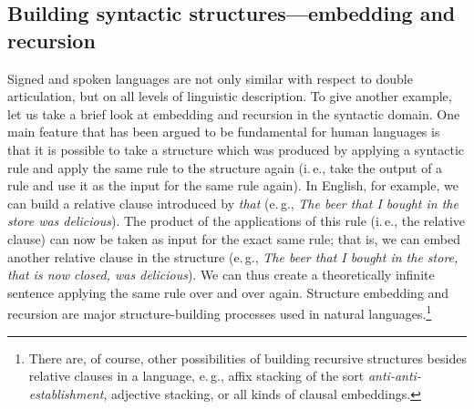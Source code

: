 \subsection{Building syntactic structures---embedding and recursion}
Signed and spoken languages are not only similar with respect to double articulation, but on all levels of linguistic description. To give another example, let us take a brief look at embedding and recursion in the syntactic domain. One main feature that has been argued to be fundamental for human languages is that it is possible to take a structure which was produced by applying a syntactic rule and apply the same rule to the structure again (i.\,e., take the output of a rule and use it as the input for the same rule again). In English, for example, we can build a relative clause introduced by \textit{that} (e.\,g., \textit{The beer that I bought in the store was delicious}). The product of the applications of this rule (i.\,e., the relative clause) can now be taken as input for the exact same rule; that is, we can embed another relative clause in the structure (e.\,g., \textit{The beer that I bought in the store, that is now closed, was delicious}). We can thus create a theoretically infinite sentence applying the same rule over and over again. Structure embedding and recursion are major structure-building processes used in natural languages.\footnote{ There are, of course, other possibilities of building recursive structures besides relative clauses in a language, e.\,g., affix stacking of the sort \textit{anti-anti-establishment}, adjective stacking, or all kinds of clausal embeddings.} 

